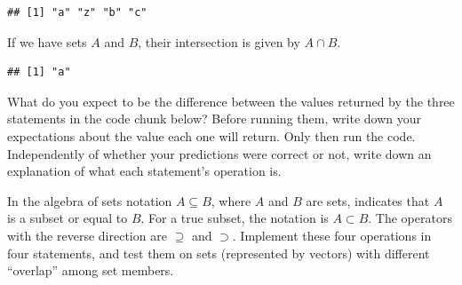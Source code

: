 \documentclass[krantz2]{krantz}\usepackage{knitr}
\begin{document}
\begin{knitrout}\footnotesize
{}\color{fgcolor}\begin{kframe}
\begin{alltt}
\hlstd{(}\hlstd{(}\hlstd{,} \hlstd{,} 
\end{alltt}
\begin{verbatim}
## [1] "a" "z" "b" "c"
\end{verbatim}
\end{kframe}
\end{knitrout}

If we have sets $A$ and $B$, their intersection is given by $A \cap B$.

\begin{knitrout}\footnotesize
{}\color{fgcolor}\begin{kframe}
\begin{alltt}
\hlstd{(}\hlstd{(}\hlstd{,} \hlstd{,} 
\end{alltt}
\begin{verbatim}
## [1] "a"
\end{verbatim}
\end{kframe}
\end{knitrout}

\begin{playground}
What do you expect to be the difference between the values returned by the three statements in the code chunk below? Before running them, write down your expectations about the value each one will return. Only then run the code. Independently of whether your predictions were correct or not, write down an explanation of what each statement's operation is.

\begin{knitrout}\footnotesize
{}\color{fgcolor}\begin{kframe}
\begin{alltt}
\hlstd{(}\hlstd{(}\hlstd{,} \hlstd{,} 
\hlstd{(}\hlstd{(}\hlstd{,} \hlstd{,} 
\hlstd{(}\hlstd{,} \hlstd{,} 
\end{alltt}
\end{kframe}
\end{knitrout}

In the algebra of sets notation $A \subseteq B$, where $A$ and $B$ are sets, indicates that $A$ is a subset or equal to $B$. For a true subset, the notation is $A \subset B$. The operators with the reverse direction are $\supseteq$ and $\supset$. Implement these four operations in four \Rlang statements, and test them on sets (represented by \Rlang vectors) with different ``overlap'' among set members.

\end{playground}
\end{document}
